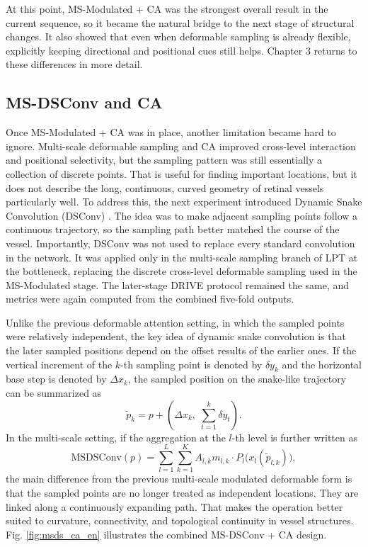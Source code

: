 \documentclass[a4paper,12pt]{article}
\begin{document}
At this point, MS-Modulated + CA was the strongest overall result in the current sequence, so it became the natural bridge to the next stage of structural changes. It also showed that even when deformable sampling is already flexible, explicitly keeping directional and positional cues still helps. Chapter 3 returns to these differences in more detail.

\subsection{MS-DSConv and CA}

Once MS-Modulated + CA was in place, another limitation became hard to ignore. Multi-scale deformable sampling and CA improved cross-level interaction and positional selectivity, but the sampling pattern was still essentially a collection of discrete points. That is useful for finding important locations, but it does not describe the long, continuous, curved geometry of retinal vessels particularly well. To address this, the next experiment introduced Dynamic Snake Convolution (DSConv) \cite{qi2023dsc}. The idea was to make adjacent sampling points follow a continuous trajectory, so the sampling path better matched the course of the vessel. Importantly, DSConv was not used to replace every standard convolution in the network. It was applied only in the multi-scale sampling branch of LPT at the bottleneck, replacing the discrete cross-level deformable sampling used in the MS-Modulated stage. The later-stage DRIVE protocol remained the same, and metrics were again computed from the combined five-fold outputs.

Unlike the previous deformable attention setting, in which the sampled points were relatively independent, the key idea of dynamic snake convolution is that the later sampled positions depend on the offset results of the earlier ones. If the vertical increment of the \(k\)-th sampling point is denoted by \(\delta y_k\) and the horizontal base step is denoted by \(\Delta x_k\), the sampled position on the snake-like trajectory can be summarized as
\[
\tilde{p}_k = p + \left(\Delta x_k,\; \sum_{t=1}^{k}\delta y_t\right).
\]
In the multi-scale setting, if the aggregation at the \(l\)-th level is further written as
\[
\mathrm{MSDSConv}(p) = \sum_{l=1}^{L}\sum_{k=1}^{K} A_{l,k} m_{l,k}\cdot P_l\big(x_l(\tilde{p}_{l,k})\big),
\]
the main difference from the previous multi-scale modulated deformable form is that the sampled points are no longer treated as independent locations. They are linked along a continuously expanding path. That makes the operation better suited to curvature, connectivity, and topological continuity in vessel structures. Fig. \ref{fig:msds_ca_en} illustrates the combined MS-DSConv + CA design.
\end{document}
